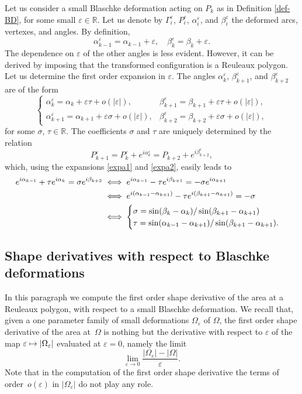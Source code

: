 \documentclass[JEP,XML,SOM,Unicode,NoFloatCountersInSection]{cedram}
\newcommand\mto{\mathchoice{\longmapsto}{\mapsto}{\mapsto}{\mapsto}}
\let\epsilon\varepsilon
\theoremstyle{plain}
\theoremstyle{definition}
\let \e\epsilon
\let\B\Gamma
\begin{document}
Let us consider a small Blaschke deformation acting on $P_k$ as in Definition \ref{def-BD}, for some small $\e\in \mathbb R$. Let us denote by $\B_i^\e$, $P_i^\e$, $\alpha_i^\e$, and $\beta_i^\e$ the deformed arcs, vertexes, and angles. By definition,
\begin{equation}\label{expa1}
\alpha_{k-1}^\e= \alpha_{k-1}+\e,\quad \beta_k^{\e} = \beta_k + \e.
\end{equation}
The dependence on $\e$ of the other angles is less evident. However, it can be derived by imposing that the transformed configuration is a Reuleaux polygon. Let us determine the first order expansion in $\e$. The angles $\alpha_k^\e$, $\beta_{k+1}^\e$, and $\beta_{k+2}^\e$ are of the form
\begin{equation}\label{expa2}
\begin{cases}
\alpha_k^\e = \alpha_k + \e \tau + {o(|\e|)}, & \beta_{k+1}^\e = \beta_{k+1} + \e \tau + o(|\e|),
\\
\alpha_{k+1}^\e = \alpha_{k+1} + \e \sigma + o(|\e|), & \beta_{k+2}^\e = \beta_{k+2} + \e \sigma + o(|\e|),
\end{cases}
\end{equation}
for some $\sigma$, $\tau\in \mathbb R$. The coefficients $\sigma$ and $\tau$ are uniquely determined by the relation
\[
P_{k+1}^\e = P_k^\e + e^{i \alpha_{k}^\e}=P_{k+2} + e^{i \beta_{k+2}^\e},
\]
which, using the expansions \eqref{expa1} and \eqref{expa2}, easily leads to
\begin{align}
e^{i \alpha_{k-1}} + \tau e^{i\alpha_k} = \sigma e^{i\beta_{k+2}}&\iff e^{i \alpha_{k-1}} - \tau e^{i\beta_{k+1}} = - \sigma e^{i\alpha_{k+1}} \notag
\\
& \iff e^{i (\alpha_{k-1} - \alpha_{k+1})} - \tau e^{i(\beta_{k+1} - \alpha_{k+1})}=-\sigma\notag
\\
& \iff
\begin{cases}\label{ab}
\sigma= \sin(\beta_k - \alpha_k) / \sin(\beta_{k+1} - \alpha_{k+1})\\ \tau= \sin(\alpha_{k-1} - \alpha_{k+1}) / \sin(\beta_{k+1} - \alpha_{k+1}).
\end{cases}
\end{align}

\subsection{Shape derivatives with respect to Blaschke deformations}
In this paragraph we compute the first order shape derivative of the area at a Reuleaux polygon, with respect to a small Blaschke deformation. We recall that, given a one parameter family of small deformations $\Omega_\e$ of $\Omega$, the first order shape derivative of the area at~$\Omega$ is nothing but the derivative with respect to $\e$ of the map
$
\e \mto |\Omega_\e|
$
evaluated at $\e=0$, namely the limit
\[
\lim_{\e \to 0} \frac{|\Omega_\e|-|\Omega|}{\e}.
\]
{Note that} in the computation of the first order shape derivative {the terms} of order~$o(\e)$ {in $|\Omega_\e|$} do not play any role.
\end{document}
